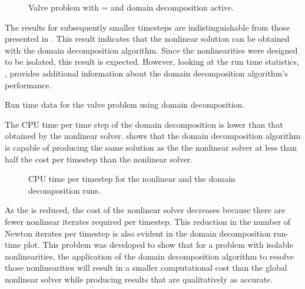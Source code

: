 \begin{figure}[h!tb]
\centering

\caption{Valve problem with \dtmax{} =  and domain decomposition active.}
\label{fig:valveDom6pt25em02}
\end{figure}

The results for subsequently smaller timesteps are indistinguishable from those presented in .
This result indicates that the nonlinear solution can be obtained with the domain decomposition algorithm.
Since the nonlinearities were designed to be isolated, this result is expected.
However, looking at the run time statistics, , provides additional information about the domain decomposition algorithm's performance.

\begin{table}[h!tb]
\centering
\singlespace

\caption{Run time data for the valve problem using domain decomposition.}
\label{tab:valveDomTable}
\end{table}

The CPU time per time step of the domain decomposition is lower than that obtained by the nonlinear solver.
 shows that the domain decomposition algorithm is capable of producing the same solution as the the nonlinear solver at less than half the cost per timestep than the nonlinear solver.

\begin{figure}[h!tb]
\centering

\caption{CPU time per timestep for the nonlinear and the domain decomposition runs.}
\label{fig:valveRunTime}
\end{figure}

As the \dtmax{} is reduced, the cost of the nonlinear solver decreases because there are fewer nonlinear iterates required per timestep.
This reduction in the number of Newton iterates per timestep is also evident in the domain decomposition run-time plot.
This problem was developed to show that for a problem with isolable nonlinearities, the application of the domain decomposition algorithm to resolve those nonlinearities will result in a smaller computational cost than the global nonlinear solver while producing results that are qualitatively as accurate.


